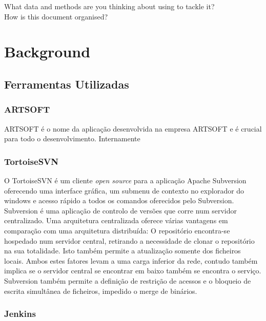 \documentclass[sigplan]{acmart}
\begin{document}
What data and methods are you thinking about using to tackle it? \\ %

How is this document organised? \\

\section{Background} \label{sec:background}

\subsection{Ferramentas Utilizadas}

\subsubsection{ARTSOFT}

ARTSOFT é o nome da aplicação desenvolvida na empresa ARTSOFT e é crucial para todo o desenvolvimento. Internamente  

\subsubsection{TortoiseSVN}

O TortoiseSVN é um cliente \textit{open source} para a aplicação Apache Subversion oferecendo uma interface gráfica, um submenu de contexto no explorador do windows e acesso rápido a todos os comandos oferecidos pelo Subversion. Subversion é uma aplicação de controlo de versões que corre num servidor centralizado. Uma arquitetura centralizada oferece várias vantagens em comparação com uma arquitetura distribuída: O repositório encontra-se hospedado num servidor central, retirando a necessidade de clonar o repositório na sua totalidade. Isto também permite a atualização somente dos ficheiros locais. Ambos estes fatores levam a uma carga inferior da rede, contudo também implica se o servidor central se encontrar em baixo também se encontra o serviço. Subversion também permite a definição de restrição de acessos e o bloqueio de escrita simultânea de ficheiros, impedido o merge de binários.

\subsubsection{Jenkins}
\end{document}
